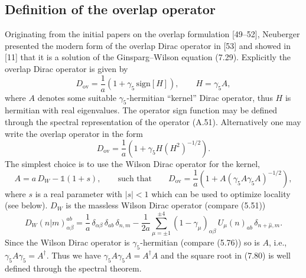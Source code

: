 \subsection{Definition of the overlap operator}

Originating from the initial papers on the overlap formulation [49--52],
Neuberger presented the modern form of the overlap Dirac operator in [53] and
showed in [11] that it is a solution of the Ginsparg--Wilson equation (7.29).
Explicitly the overlap Dirac operator is given by
\begin{equation}
  D_{\mathrm{ov}} = \frac{1}{a}\left(1 + \gamma_5\,\mathrm{sign}[H]\right),
  \qquad
  H = \gamma_5 A,
\end{equation}
where $A$ denotes some suitable $\gamma_5$-hermitian ``kernel'' Dirac operator,
thus $H$ is hermitian with real eigenvalues. The operator sign function may be
defined through the spectral representation of the operator (A.51).
Alternatively one may write the overlap operator in the form
\begin{equation}
  D_{\mathrm{ov}} = \frac{1}{a}\left(1 + \gamma_5 H\left(H^2\right)^{-1/2}\right).
\end{equation}
The simplest choice is to use the Wilson Dirac operator for the kernel,
\begin{equation}
  A = a\,D_W - \mathbb{1}(1+s), \qquad
  \text{such that} \qquad
  D_{\mathrm{ov}} = \frac{1}{a}\left(1 + A\left(\gamma_5 A\gamma_5 A\right)^{-1/2}\right),
\end{equation}
where $s$ is a real parameter with $|s| < 1$ which can be used to optimize
locality (see below). $D_W$ is the massless Wilson Dirac operator (compare
(5.51))
\begin{equation}
  D_W(n|m)^{ab}_{\alpha\beta} = \frac{1}{a}\,\delta_{\alpha\beta}\,\delta_{ab}\,
  \delta_{n,m}
  - \frac{1}{2a}\sum_{\mu=\pm1}^{\pm4}(1-\gamma_\mu)_{\alpha\beta}\,
    U_\mu(n)_{ab}\,\delta_{n+\hat\mu,m} .
\end{equation}
Since the Wilson Dirac operator is $\gamma_5$-hermitian (compare (5.76)) so is
$A$, i.e., $\gamma_5 A\gamma_5 = A^\dagger$. Thus we have
$\gamma_5 A\gamma_5 A = A^\dagger A$ and the square root in (7.80) is well
defined through the spectral theorem.

